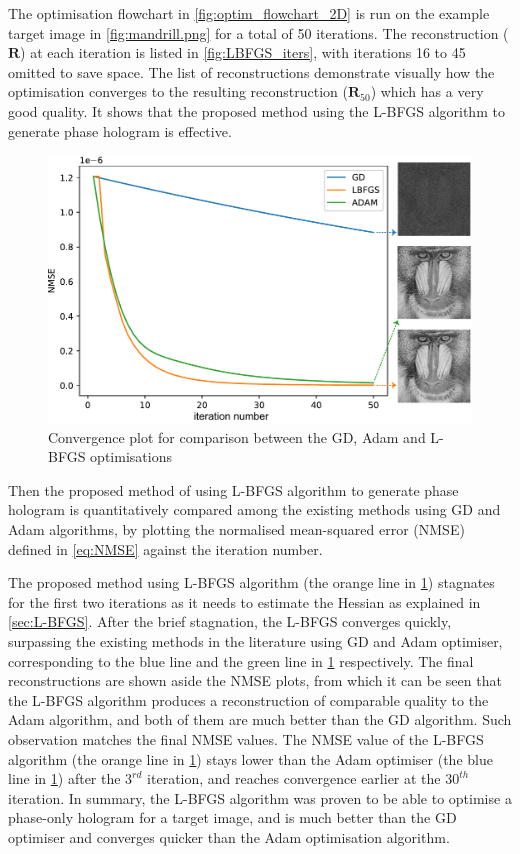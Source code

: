 The optimisation flowchart in \cref{fig:optim_flowchart_2D} is run on the example target image in \cref{fig:mandrill.png} for a total of 50 iterations. The reconstruction ($\textbf{R}$) at each iteration is listed in \cref{fig:LBFGS_iters}, with iterations 16 to 45 omitted to save space. The list of reconstructions demonstrate visually how the optimisation converges to the resulting reconstruction ($\textbf{R}_{50}$) which has a very good quality. It shows that the proposed method using the L-BFGS algorithm to generate phase hologram is effective.

\begin{figure}[H]
	\centering
	\includegraphics[width=\textwidth]{GD_ADAM_LBFGS.pdf}
	\caption{Convergence plot for comparison between the GD, Adam and L-BFGS optimisations}
	\label{fig:GD_ADAM_LBFGS}
\end{figure}

Then the proposed method of using L-BFGS algorithm to generate phase hologram is quantitatively compared among the existing methods using GD and Adam algorithms, by plotting the normalised mean-squared error (NMSE) defined in \cref{eq:NMSE} against the iteration number.

The proposed method using L-BFGS algorithm (the orange line in \cref{fig:GD_ADAM_LBFGS}) stagnates for the first two iterations as it needs to estimate the Hessian as explained in \cref{sec:L-BFGS}. After the brief stagnation, the L-BFGS converges quickly, surpassing the existing methods in the literature using GD and Adam optimiser, corresponding to the blue line and the green line in \cref{fig:GD_ADAM_LBFGS} respectively. The final reconstructions are shown aside the NMSE plots, from which it can be seen that the L-BFGS algorithm produces a reconstruction of comparable quality to the Adam algorithm, and both of them are much better than the GD algorithm. Such observation matches the final NMSE values. The NMSE value of the L-BFGS algorithm (the orange line in \cref{fig:GD_ADAM_LBFGS}) stays lower than the Adam optimiser (the blue line in \cref{fig:GD_ADAM_LBFGS}) after the $3^{rd}$ iteration, and reaches convergence earlier at the $30^{th}$ iteration. In summary, the L-BFGS algorithm was proven to be able to optimise a phase-only hologram for a target image, and is much better than the GD optimiser and converges quicker than the Adam optimisation algorithm.


